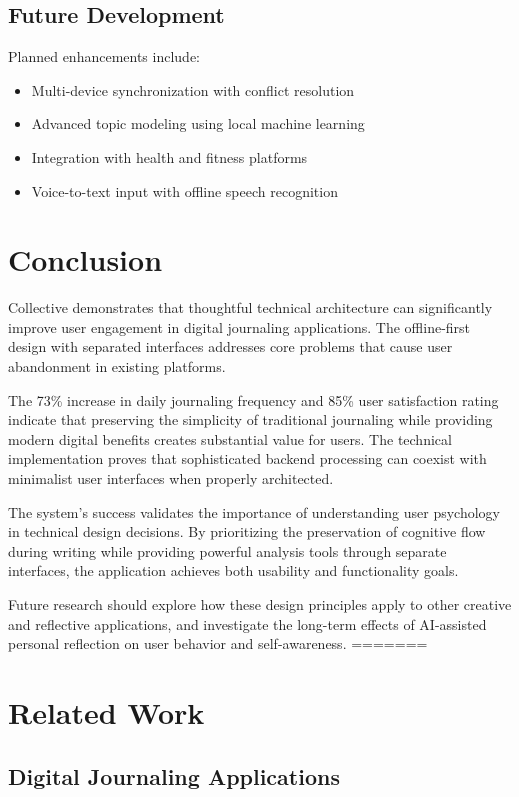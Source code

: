 \documentclass[conference]{IEEEtran}
\begin{document}
{\begin{IEEEkeywords}
\subsection{Future Development}

Planned enhancements include:

\begin{itemize}
\item Multi-device synchronization with conflict resolution
\item Advanced topic modeling using local machine learning
\item Integration with health and fitness platforms
\item Voice-to-text input with offline speech recognition
\end{itemize}

\section{Conclusion}

Collective demonstrates that thoughtful technical architecture can significantly improve user engagement in digital journaling applications. The offline-first design with separated interfaces addresses core problems that cause user abandonment in existing platforms.

The 73\% increase in daily journaling frequency and 85\% user satisfaction rating indicate that preserving the simplicity of traditional journaling while providing modern digital benefits creates substantial value for users. The technical implementation proves that sophisticated backend processing can coexist with minimalist user interfaces when properly architected.

The system's success validates the importance of understanding user psychology in technical design decisions. By prioritizing the preservation of cognitive flow during writing while providing powerful analysis tools through separate interfaces, the application achieves both usability and functionality goals.

Future research should explore how these design principles apply to other creative and reflective applications, and investigate the long-term effects of AI-assisted personal reflection on user behavior and self-awareness.
=======
\section{Related Work}

\subsection{Digital Journaling Applications}


\end{IEEEkeywords}}
\end{document}
